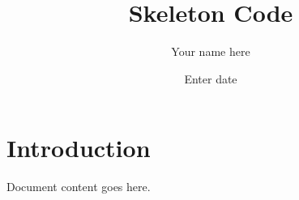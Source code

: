 \documentclass{article}
\title{Skeleton Code}
\author{Your name here }
\date{Enter date}
\begin{document}
\maketitle

\section{Introduction}

Document content goes here.
\end{document}
